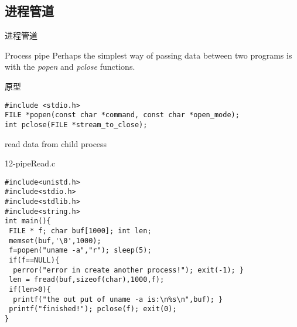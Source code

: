 \documentclass{beamer}
\begin{document}
\subsection{进程管道}
\begin{frame}
\Huge{\centerline{进程管道}}
\end{frame}
\begin{frame}[fragile]{Process pipe}
Perhaps the simplest way of passing data between two programs is with the \emph{popen} and \emph{pclose} functions. 
\begin{block}{原型}
\begin{verbatim}
#include <stdio.h>
FILE *popen(const char *command, const char *open_mode);
int pclose(FILE *stream_to_close);
\end{verbatim}
\end{block}
\end{frame}

\begin{frame}[fragile]{read data from child process}
\begin{block}{12-pipeRead.c}
\begin{verbatim}
#include<unistd.h>
#include<stdio.h>
#include<stdlib.h>
#include<string.h>
int main(){
 FILE * f; char buf[1000]; int len;
 memset(buf,'\0',1000);
 f=popen("uname -a","r"); sleep(5);
 if(f==NULL){
  perror("error in create another process!"); exit(-1); }
 len = fread(buf,sizeof(char),1000,f);
 if(len>0){
  printf("the out put of uname -a is:\n%s\n",buf); }	
 printf("finished!"); pclose(f); exit(0);
}
\end{verbatim}
\end{block}
\end{frame}
\end{document}
